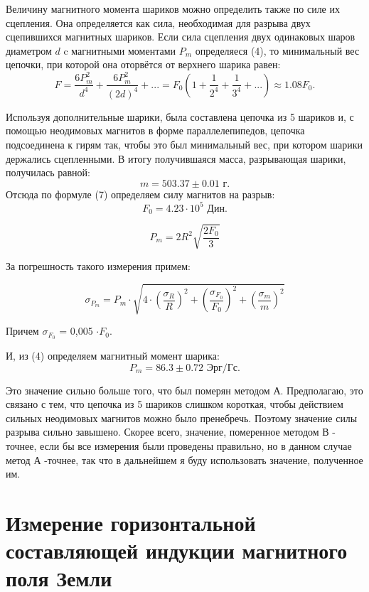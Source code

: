 \documentclass[a4paper, 14pt]{extarticle}%
\begin{document}
Величину магнитного момента шариков можно
определить также по силе их сцепления. Она определяется как
сила, необходимая для разрыва двух сцепившихся магнитных
шариков. Если сила сцепления двух одинаковых шаров диаметром $d$ c магнитными моментами $P_m$ определяеся (4), то минимальный вес цепочки, при которой она оторвётся от верхнего шарика равен:
\begin{equation}
F = \frac{6P_m^2}{d^4} + \frac{6P_m^2}{(2d)^4} + ... = F_0\left(1+ \frac{1}{2^4}+\frac{1}{3^4}+...\right) \approx 1.08F_0.
\end{equation}

Используя дополнительные шарики, была составлена цепочка из 5 шариков и, с помощью
неодимовых магнитов в форме параллелепипедов, цепочка подсоединена к гирям так, чтобы это был минимальный вес, при котором шарики держались сцепленными. В итогу получившаяся масса, разрывающая шарики, получилась равной:
\[m = 503.37 \pm 0.01 \text{ г}.\]
Отсюда по формуле (7) определяем силу магнитов на разрыв:
\[F_0 = 4.23\cdot 10^5 \text{ Дин}. \]

\begin{equation}
P_m = 2R^2\sqrt{\frac{2F_0}{3}}
\end{equation}

За погрешность такого измерения примем:

\begin{equation}
\sigma_{P_m} = P_m\cdot \sqrt{4\cdot(\frac{\sigma_R}{R})^2 + (\frac{\sigma_{F_0}}{F_0})^2 + (\frac{\sigma_{m}}{m})^2}
\end{equation}

Причем $\sigma_{F_0}$ = 0,005 $\cdot F_0$.

И, из (4) определяем магнитный момент шарика:
\[P_m = 86.3 \pm 0.72 \text{ Эрг/Гс}.\]

Это значение сильно больше того, что был померян методом А. Предполагаю, это связано с тем, что цепочка из 5 шариков слишком короткая, чтобы действием сильных неодимовых магнитов можно было пренебречь. Поэтому значение силы разрыва сильно завышено. Скорее всего, значение, померенное методом В - точнее, если бы все измерения были проведены правильно, но в данном случае метод А -точнее, так что в дальнейшем я буду использовать значение, полученное им.

\section{Измерение горизонтальной составляющей индукции магнитного поля Земли}
\end{document}
